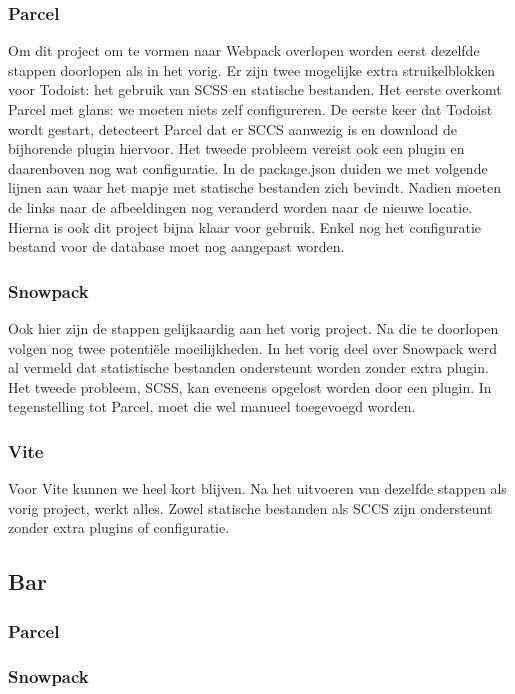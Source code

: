 \subsubsection{Parcel}
Om dit project om te vormen naar Webpack overlopen worden eerst dezelfde stappen doorlopen als in het vorig. Er zijn twee mogelijke extra struikelblokken voor Todoist: het gebruik van SCSS en statische bestanden. Het eerste overkomt Parcel met glans: we moeten niets zelf configureren. De eerste keer dat Todoist wordt gestart, detecteert Parcel dat er SCCS aanwezig is en download de bijhorende plugin hiervoor. Het tweede probleem vereist ook een plugin en daarenboven nog wat configuratie. In de package.json duiden we met volgende lijnen aan waar het mapje met statische bestanden zich bevindt. Nadien moeten de links naar de afbeeldingen nog veranderd worden naar de nieuwe locatie. Hierna is ook dit project bijna klaar voor gebruik. Enkel nog het configuratie bestand voor de database moet nog aangepast worden.

\subsubsection{Snowpack}
Ook hier zijn de stappen gelijkaardig aan het vorig project. Na die te doorlopen volgen nog twee potentiële moeilijkheden. In het vorig deel over Snowpack werd al vermeld dat statistische bestanden ondersteunt worden zonder extra plugin. Het tweede probleem, SCSS, kan eveneens opgelost worden door een plugin. In tegenstelling tot Parcel, moet die wel manueel toegevoegd worden. 

\subsubsection{Vite}
Voor Vite kunnen we heel kort blijven. Na het uitvoeren van dezelfde stappen als vorig project, werkt alles. Zowel statische bestanden als SCCS zijn ondersteunt zonder extra plugins of configuratie.

\subsection{Bar}

\subsubsection{Parcel}

\subsubsection{Snowpack}


